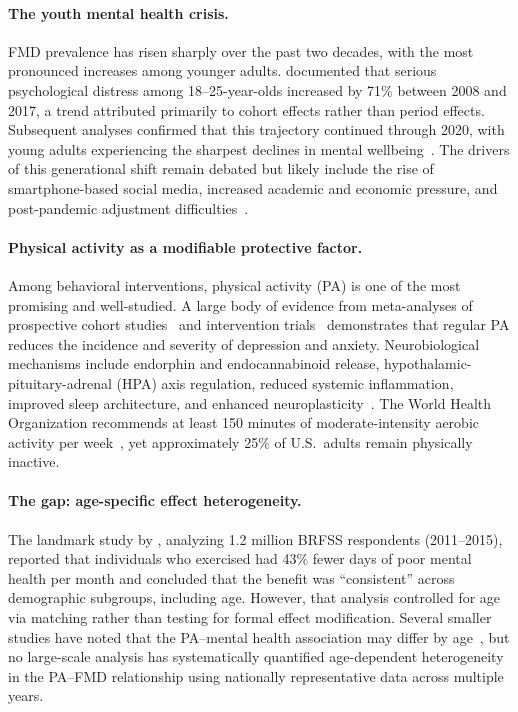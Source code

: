 \documentclass[11pt]{article}
\begin{document}
\paragraph{The youth mental health crisis.}
FMD prevalence has risen sharply over the past two decades, with the most pronounced increases among younger adults.
\citet{twenge2019age} documented that serious psychological distress among 18--25-year-olds increased by 71\% between 2008 and 2017, a trend attributed primarily to cohort effects rather than period effects.
Subsequent analyses confirmed that this trajectory continued through 2020, with young adults experiencing the sharpest declines in mental wellbeing~\citep{twenge2023increases,goodwin2022trends}.
The drivers of this generational shift remain debated but likely include the rise of smartphone-based social media, increased academic and economic pressure, and post-pandemic adjustment difficulties~\citep{haidt2023adolescent,arnett2000emerging}.

\paragraph{Physical activity as a modifiable protective factor.}
Among behavioral interventions, physical activity (PA) is one of the most promising and well-studied.
A large body of evidence from meta-analyses of prospective cohort studies~\citep{schuch2018physical,pearce2022association} and intervention trials~\citep{singh2023effectiveness} demonstrates that regular PA reduces the incidence and severity of depression and anxiety.
Neurobiological mechanisms include endorphin and endocannabinoid release, hypothalamic-pituitary-adrenal (HPA) axis regulation, reduced systemic inflammation, improved sleep architecture, and enhanced neuroplasticity~\citep{dishman2006neurobiology,lubans2016physical}.
The World Health Organization recommends at least 150 minutes of moderate-intensity aerobic activity per week~\citep{who2020guidelines}, yet approximately 25\% of U.S.\ adults remain physically inactive.

\paragraph{The gap: age-specific effect heterogeneity.}
The landmark study by \citet{chekroud2018association}, analyzing 1.2 million BRFSS respondents (2011--2015), reported that individuals who exercised had 43\% fewer days of poor mental health per month and concluded that the benefit was ``consistent'' across demographic subgroups, including age.
However, that analysis controlled for age via matching rather than testing for formal effect modification.
Several smaller studies have noted that the PA--mental health association may differ by age~\citep{harvey2018exercise,mcmahon2017physical,kandola2019depressive}, but no large-scale analysis has systematically quantified age-dependent heterogeneity in the PA--FMD relationship using nationally representative data across multiple years.
\end{document}

